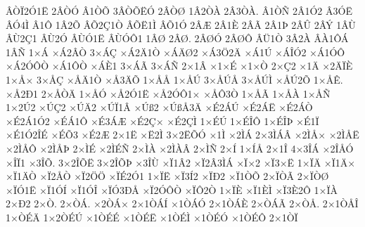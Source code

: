 {^^c2^^d2^^cf2^^d31^^cb
2^^c2^^d2^^d3
^^c21^^d2^^d5
3^^c2^^d2^^d5^^cb^^d3
2^^c2^^d2^^d8
1^^c22^^d2^^c0
2^^c23^^d2^^c0.
^^c21^^d2^^d1
2^^c21^^d32
^^c23^^d3^^cb
^^c2^^d34^^cc
^^c21^^d4
1^^c22^^d5
^^c2^^d52^^c71^^d2
^^c2^^d5^^cb1^^cc
^^c2^^d51^^d3
2^^c2^^c6
2^^c21^^c8
2^^c2^^c3
2^^c21^^de
2^^c2^^db
2^^c2^^dd
1^^c2^^d9
^^c2^^d92^^c71
^^c2^^d92^^d3
^^c2^^d9^^d31^^cb
^^c2^^d9^^d3^^d41
1^^c2^^d8
2^^c2^^d8.
2^^c2^^d8^^d3
2^^c2^^d8^^d4
^^c2^^dc1^^d2
3^^c22^^c0
^^c2^^c01^^d4^^c1
1^^c2^^d1
1^^d7^^c1
^^d7^^c12^^c2^^d2
3^^d7^^c1^^c7
^^d7^^c12^^c41^^d2
^^d7^^c1^^c4^^d82
^^d7^^c13^^d62^^c4
^^d7^^c11^^da
^^d7^^c1^^ce^^d32
^^d7^^c11^^d3^^d4
^^d7^^c12^^d3^^d4^^d2
^^d7^^c11^^d4^^d2
^^d7^^c1^^c81
3^^d7^^c1^^c3
3^^d7^^c1^^d1
2^^d71^^c2
^^d71^^d7^^c9
^^d71^^d7^^d2
2^^d7^^c72
^^d71^^c4
^^d72^^c4^^cf^^c8
1^^d7^^c5^^d7
3^^d7^^c5^^c7
^^d7^^c5^^c41^^d2
^^d7^^c53^^c4^^d5
1^^d7^^c5^^c5
1^^d7^^c5^^da
3^^d7^^c5^^da^^c5
3^^d7^^c5^^da^^cc
^^d7^^c5^^da2^^d5
1^^d7^^c5^^ca.
^^d7^^c52^^d01
2^^d7^^c5^^d2^^c4
1^^d7^^c5^^d3
^^d7^^c52^^d31^^cb
^^d7^^c52^^d3^^d41^^d7
^^d7^^c5^^d43^^d2
1^^d7^^c5^^c3
1^^d7^^c5^^c0
1^^d7^^c5^^d1
1^^d72^^da2
^^d7^^da^^c72
^^d7^^da^^c42
^^d7^^da^^cf1^^c2
^^d7^^da^^df2
^^d7^^da^^df^^c53^^c4
^^d7^^c92^^c1^^da
^^d7^^c92^^c1^^cb
^^d7^^c92^^c1^^d2
^^d7^^c92^^c11^^d32
^^d7^^c9^^c11^^d4
^^d7^^c93^^c1^^c6
^^d7^^c92^^c7^^d7
^^d7^^c92^^c7^^cc
1^^d7^^c9^^da
1^^d7^^c9^^ce^^d4
1^^d7^^c9^^ce^^de
^^d7^^c91^^cf
^^d7^^c91^^d32^^ce^^c9
^^d7^^c9^^d53
^^d7^^c92^^c6
2^^d71^^cb
^^d7^^cb2^^cc
3^^d72^^cb^^d5^^d3
^^d71^^cc
^^d72^^cc^^c1
2^^d73^^cc^^c1^^c2
^^d72^^cc^^c5^^d7
^^d72^^cc^^c5^^cb
^^d72^^cc^^c5^^d4
^^d72^^cc^^c5^^de
2^^d7^^cc^^c9
^^d72^^cc^^c9^^d1
2^^d7^^cc^^c0
^^d72^^cc^^c0^^c2
2^^d7^^cc^^d1
2^^d7^^cd
1^^d7^^cd^^c5
2^^d71^^ce
4^^d73^^ce^^c1
^^d72^^ce^^c5^^d3
^^d7^^ce^^cf1
^^d73^^ce^^d5.
3^^d72^^ce^^d5^^cb
3^^d72^^ce^^d5^^de
^^d73^^ce^^d9
^^d7^^cf1^^c22
^^d7^^cf2^^c23^^cc^^c1
^^d7^^cf^^d72
^^d7^^cf3^^d7^^cb
1^^d7^^cf^^c4
^^d7^^cf1^^c4^^d7
^^d7^^cf1^^c4^^d2
^^d7^^cf2^^c5^^d2
^^d7^^cf2^^d6^^d6
^^d7^^cf^^c92^^d31
1^^d7^^cf^^cb
^^d7^^cf3^^cd2
^^d7^^cf^^d02
^^d7^^cf1^^d2^^d5
2^^d7^^cf^^d2^^c3
2^^d7^^cf^^d2^^d8
^^d7^^cf^^d31^^cb
^^d7^^cf1^^d3^^cd
^^d7^^cf1^^d3^^ce
^^d7^^cf^^d33^^d0^^c5
^^d7^^cf2^^d3^^d4^^d2
^^d7^^cf^^d42^^d2
1^^d7^^cf^^c8
^^d7^^cf1^^c8^^cc
^^d7^^cf3^^c82^^d4
1^^d7^^cf^^c0
2^^d7^^d02
2^^d7^^d2.
2^^d7^^d2^^c1.
^^d72^^d2^^c1^^d7
2^^d71^^d2^^c1^^cd
^^d71^^d2^^c1^^d3
2^^d71^^d2^^c1^^c8
2^^d7^^d2^^c1^^c3
2^^d7^^d2^^c5.
2^^d71^^d2^^c5^^ce
1^^d7^^d2^^c9^^c4
1^^d72^^d2^^c9^^da
^^d71^^d2^^c9^^c9
^^d71^^d2^^c9^^cb
^^d71^^d2^^c9^^cc
^^d71^^d2^^c9^^d3
^^d71^^d2^^c9^^d4
2^^d71^^d2^^cf
}
